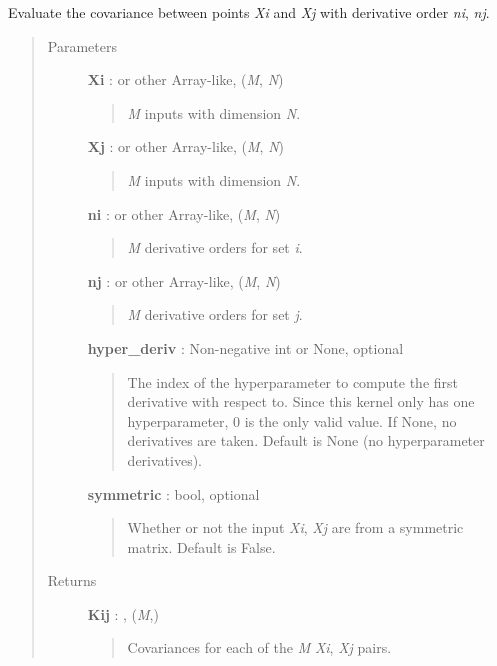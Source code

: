 \documentclass[letterpaper,10pt,english]{sphinxmanual}
\begin{document}
\begin{fulllineitems}
\begin{fulllineitems}
\label{gptools.kernel:gptools.kernel.noise.DiagonalNoiseKernel.__call__}
Evaluate the covariance between points \emph{Xi} and \emph{Xj} with derivative order \emph{ni}, \emph{nj}.
\begin{quote}\begin{description}
\item[{Parameters }] \leavevmode
\textbf{Xi} :  or other Array-like, (\emph{M}, \emph{N})
\begin{quote}

\emph{M} inputs with dimension \emph{N}.
\end{quote}

\textbf{Xj} :  or other Array-like, (\emph{M}, \emph{N})
\begin{quote}

\emph{M} inputs with dimension \emph{N}.
\end{quote}

\textbf{ni} :  or other Array-like, (\emph{M}, \emph{N})
\begin{quote}

\emph{M} derivative orders for set \emph{i}.
\end{quote}

\textbf{nj} :  or other Array-like, (\emph{M}, \emph{N})
\begin{quote}

\emph{M} derivative orders for set \emph{j}.
\end{quote}

\textbf{hyper\_deriv} : Non-negative int or None, optional
\begin{quote}

The index of the hyperparameter to compute the first derivative
with respect to. Since this kernel only has one hyperparameter, 0
is the only valid value. If None, no derivatives are taken. Default
is None (no hyperparameter derivatives).
\end{quote}

\textbf{symmetric} : bool, optional
\begin{quote}

Whether or not the input \emph{Xi}, \emph{Xj} are from a symmetric matrix.
Default is False.
\end{quote}

\item[{Returns }] \leavevmode
\textbf{Kij} : , (\emph{M},)
\begin{quote}

Covariances for each of the \emph{M} \emph{Xi}, \emph{Xj} pairs.
\end{quote}

\end{description}\end{quote}

\end{fulllineitems}


\end{fulllineitems}
\end{document}
